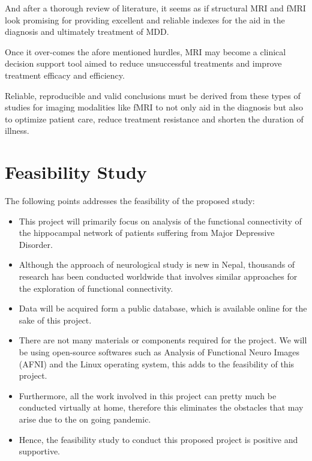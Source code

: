\documentclass{article}
\begin{document}
And after a thorough review of literature, it seems as if structural
MRI and fMRI look promising for providing excellent and reliable
indexes for the aid in the diagnosis and ultimately treatment of MDD.

Once it over-comes the afore mentioned hurdles, MRI may become a
clinical decision support tool aimed to reduce unsuccessful treatments
and improve treatment efficacy and efficiency.

Reliable, reproducible and valid conclusions must be derived from
these types of studies for imaging modalities like fMRI to not only
aid in the diagnosis but also to optimize patient care, reduce
treatment resistance and shorten the duration of illness.

\section{Feasibility Study}

The following points addresses the feasibility of the proposed study:

\begin{itemize}

  \item This project will primarily focus on analysis of the
    functional connectivity of the hippocampal network of patients
    suffering from Major Depressive Disorder.

  \item Although the approach of neurological study is new in Nepal,
    thousands of research has been conducted worldwide that involves
    similar approaches for the exploration of functional connectivity.


  \item Data will be acquired form a public database, which is
    available online for the sake of this project.

  \item There are not many materials or components required for the
    project. We will be using open-source softwares such as Analysis
    of Functional Neuro Images (AFNI) and the Linux operating system,
    this adds to the feasibility of this project.

  \item Furthermore, all the work involved in this project can pretty
    much be conducted virtually at home, therefore this eliminates the
    obstacles that may arise due to the on going pandemic.

  \item Hence, the feasibility study to conduct this proposed project
    is positive and supportive.

\end{itemize}
\end{document}
